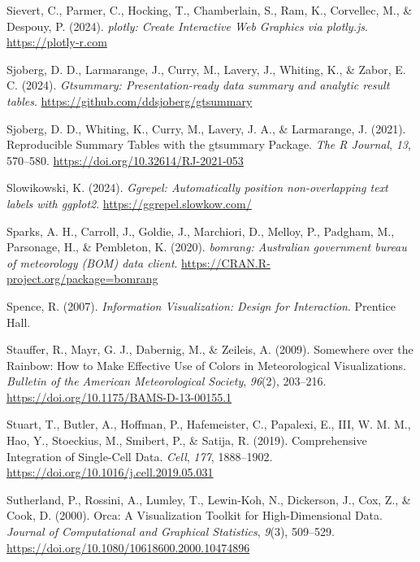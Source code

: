 \documentclass[
  letterpaper,
]{krantz}
\newlength{\cslhangindent}
\newenvironment{CSLReferences}[2] %
 {\begin{list}{}{%
  \setlength{\itemindent}{0pt}
  \setlength{\leftmargin}{0pt}
  \setlength{\parsep}{0pt}
  \ifodd #1
   \setlength{\leftmargin}{\cslhangindent}
   \setlength{\itemindent}{-1\cslhangindent}
  \fi
  \setlength{\itemsep}{#2\baselineskip}}}
 {\end{list}}
\begin{document}
\begin{CSLReferences}{1}{0}
Sievert, C., Parmer, C., Hocking, T., Chamberlain, S., Ram, K.,
Corvellec, M., \& Despouy, P. (2024). \emph{{plotly}: {C}reate
{I}nteractive {W}eb {G}raphics via {plotly.js}}.
\url{https://plotly-r.com}

Sjoberg, D. D., Larmarange, J., Curry, M., Lavery, J., Whiting, K., \&
Zabor, E. C. (2024). \emph{Gtsummary: Presentation-ready data summary
and analytic result tables}.
\url{https://github.com/ddsjoberg/gtsummary}

Sjoberg, D. D., Whiting, K., Curry, M., Lavery, J. A., \& Larmarange, J.
(2021). Reproducible {S}ummary {T}ables with the {gtsummary} {P}ackage.
\emph{{The R Journal}}, \emph{13}, 570--580.
\url{https://doi.org/10.32614/RJ-2021-053}

Slowikowski, K. (2024). \emph{Ggrepel: Automatically position
non-overlapping text labels with ggplot2}.
\url{https://ggrepel.slowkow.com/}

Sparks, A. H., Carroll, J., Goldie, J., Marchiori, D., Melloy, P.,
Padgham, M., Parsonage, H., \& Pembleton, K. (2020). \emph{{bomrang}:
Australian government bureau of meteorology (BOM) data client}.
\url{https://CRAN.R-project.org/package=bomrang}

Spence, R. (2007). \emph{Information {V}isualization: {D}esign for
{I}nteraction}. Prentice Hall.

Stauffer, R., Mayr, G. J., Dabernig, M., \& Zeileis, A. (2009).
{S}omewhere over the {R}ainbow: {H}ow to {M}ake {E}ffective {U}se of
{C}olors in {M}eteorological {V}isualizations. \emph{Bulletin of the
American Meteorological Society}, \emph{96}(2), 203--216.
\url{https://doi.org/10.1175/BAMS-D-13-00155.1}

Stuart, T., Butler, A., Hoffman, P., Hafemeister, C., Papalexi, E., III,
W. M. M., Hao, Y., Stoeckius, M., Smibert, P., \& Satija, R. (2019).
Comprehensive {I}ntegration of {S}ingle-{C}ell {D}ata. \emph{Cell},
\emph{177}, 1888--1902. \url{https://doi.org/10.1016/j.cell.2019.05.031}

Sutherland, P., Rossini, A., Lumley, T., Lewin-Koh, N., Dickerson, J.,
Cox, Z., \& Cook, D. (2000). Orca: A {V}isualization {T}oolkit for
{H}igh-{D}imensional {D}ata. \emph{Journal of Computational and
Graphical Statistics}, \emph{9}(3), 509--529.
\url{https://doi.org/10.1080/10618600.2000.10474896}


\end{CSLReferences}
\end{document}
